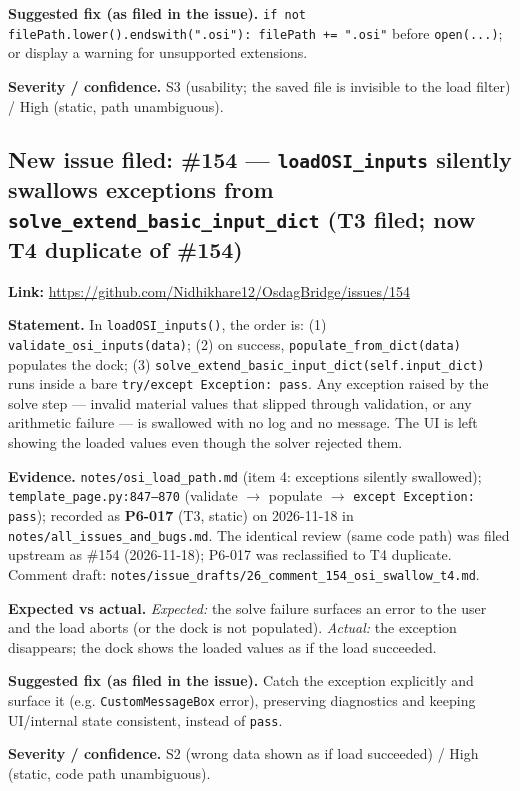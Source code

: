 \documentclass[11pt,a4paper]{article}
\begin{document}
\textbf{Suggested fix (as filed in the issue).} \texttt{if not filePath.lower().endswith(".osi"): filePath += ".osi"} before \texttt{open(...)}; or display a warning for unsupported extensions.

\textbf{Severity / confidence.} S3 (usability; the saved file is invisible to the load filter) / High (static, path unambiguous).

\subsection{New issue filed: \#154 --- \texttt{loadOSI\_inputs} silently swallows exceptions from \texttt{solve\_extend\_basic\_input\_dict} (T3 filed; now T4 duplicate of \#154)}
\textbf{Link:} \url{https://github.com/Nidhikhare12/OsdagBridge/issues/154}

\textbf{Statement.} In \texttt{loadOSI\_inputs()}, the order is: (1) \texttt{validate\_osi\_inputs(data)}; (2) on success, \texttt{populate\_from\_dict(data)} populates the dock; (3) \texttt{solve\_extend\_basic\_input\_dict(self.input\_dict)} runs inside a bare \texttt{try/except Exception: pass}. Any exception raised by the solve step --- invalid material values that slipped through validation, or any arithmetic failure --- is swallowed with no log and no message. The UI is left showing the loaded values even though the solver rejected them.

\textbf{Evidence.} \texttt{notes/osi\_load\_path.md} (item 4: exceptions silently swallowed); \texttt{template\_page.py:847--870} (validate $\rightarrow$ populate $\rightarrow$ \texttt{except Exception: pass}); recorded as \textbf{P6-017} (T3, static) on 2026-11-18 in \texttt{notes/all\_issues\_and\_bugs.md}. The identical review (same code path) was filed upstream as \#154 (2026-11-18); P6-017 was reclassified to T4 duplicate. Comment draft: \texttt{notes/issue\_drafts/26\_comment\_154\_osi\_swallow\_t4.md}.

\textbf{Expected vs actual.} \emph{Expected:} the solve failure surfaces an error to the user and the load aborts (or the dock is not populated). \emph{Actual:} the exception disappears; the dock shows the loaded values as if the load succeeded.

\textbf{Suggested fix (as filed in the issue).} Catch the exception explicitly and surface it (e.g. \texttt{CustomMessageBox} error), preserving diagnostics and keeping UI/internal state consistent, instead of \texttt{pass}.

\textbf{Severity / confidence.} S2 (wrong data shown as if load succeeded) / High (static, code path unambiguous).
\end{document}

